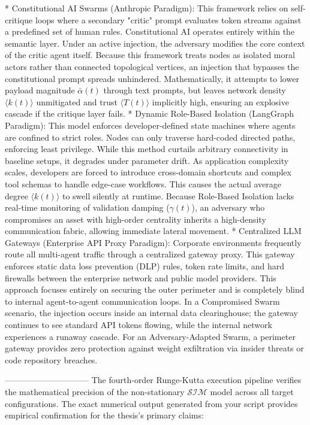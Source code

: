 * Constitutional AI Swarms (Anthropic Paradigm): This framework relies on self-critique loops where a secondary "critic" prompt evaluates token streams against a predefined set of human rules. Constitutional AI operates entirely within the semantic layer. Under an active injection, the adversary modifies the core context of the critic agent itself. Because this framework treats nodes as isolated moral actors rather than connected topological vertices, an injection that bypasses the constitutional prompt spreads unhindered. Mathematically, it attempts to lower payload magnitude $\bar{\alpha}(t)$ through text prompts, but leaves network density $\langle k(t) \rangle$ unmitigated and trust $\langle T(t) \rangle$ implicitly high, ensuring an explosive cascade if the critique layer fails.
* Dynamic Role-Based Isolation (LangGraph Paradigm): This model enforces developer-defined state machines where agents are confined to strict roles. Nodes can only traverse hard-coded directed paths, enforcing least privilege. While this method curtails arbitrary connectivity in baseline setups, it degrades under parameter drift. As application complexity scales, developers are forced to introduce cross-domain shortcuts and complex tool schemas to handle edge-case workflows. This causes the actual average degree $\langle k(t) \rangle$ to swell silently at runtime. Because Role-Based Isolation lacks real-time monitoring of validation damping ($\gamma(t)$), an adversary who compromises an asset with high-order centrality inherits a high-density communication fabric, allowing immediate lateral movement.
* Centralized LLM Gateways (Enterprise API Proxy Paradigm): Corporate environments frequently route all multi-agent traffic through a centralized gateway proxy. This gateway enforces static data loss prevention (DLP) rules, token rate limits, and hard firewalls between the enterprise network and public model providers. This approach focuses entirely on securing the outer perimeter and is completely blind to internal agent-to-agent communication loops. In a Compromised Swarm scenario, the injection occurs inside an internal data clearinghouse; the gateway continues to see standard API tokens flowing, while the internal network experiences a runaway cascade. For an Adversary-Adapted Swarm, a perimeter gateway provides zero protection against weight exfiltration via insider threats or code repository breaches.

------------------------------
The fourth-order Runge-Kutta execution pipeline verifies the mathematical precision of the non-stationary $\mathcal{S}\mathcal{I}\mathcal{M}$ model across all target configurations.
The exact numerical output generated from your script provides empirical confirmation for the thesis's primary claims:

